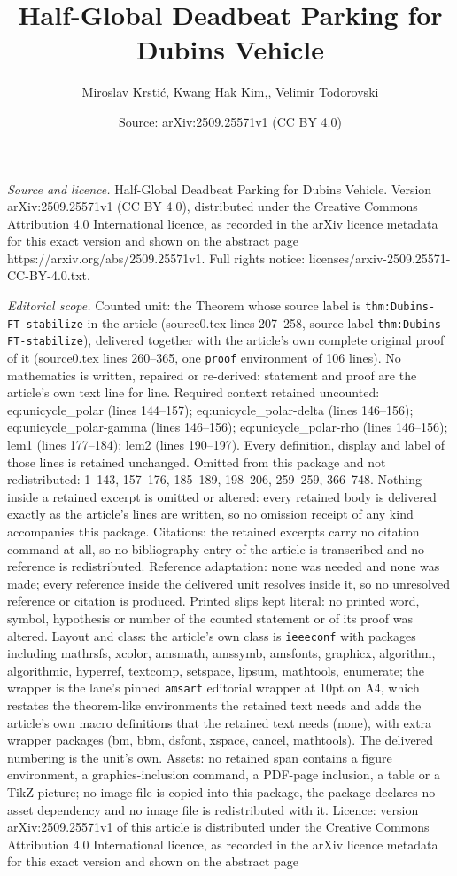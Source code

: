 \documentclass[10pt,a4paper]{amsart}
\title[Half-Global Deadbeat Parking for Dubins Vehicle]{Half-Global Deadbeat Parking for Dubins Vehicle}
\author{Miroslav Krsti\'c, Kwang Hak Kim,, Velimir Todorovski}
\date{Source: arXiv:2509.25571v1 (CC BY 4.0)}
\begin{document}
\maketitle

\noindent\emph{Source and licence.} Half-Global Deadbeat Parking for Dubins Vehicle. Version arXiv:2509.25571v1 (CC BY 4.0), distributed under the Creative Commons Attribution 4.0 International licence, as recorded in the arXiv licence metadata for this exact version and shown on the abstract page https://arxiv.org/abs/2509.25571v1. Full rights notice: licenses/arxiv-2509.25571-CC-BY-4.0.txt.\par\smallskip

\noindent\textit{Editorial scope.} Counted unit: the Theorem whose source label is \texttt{thm:Dubins-FT-stabilize} in the article (source0.tex lines 207--258, source label \texttt{thm:Dubins-FT-stabilize}), delivered together with the article's own complete original proof of it (source0.tex lines 260--365, one \texttt{proof} environment of 106 lines). No mathematics is written, repaired or re-derived: statement and proof are the article's own text line for line. Required context retained uncounted: eq:unicycle\_polar (lines 144--157); eq:unicycle\_polar-delta (lines 146--156); eq:unicycle\_polar-gamma (lines 146--156); eq:unicycle\_polar-rho (lines 146--156); lem1 (lines 177--184); lem2 (lines 190--197). Every definition, display and label of those lines is retained unchanged. Omitted from this package and not redistributed: 1--143, 157--176, 185--189, 198--206, 259--259, 366--748. Nothing inside a retained excerpt is omitted or altered: every retained body is delivered exactly as the article's lines are written, so no omission receipt of any kind accompanies this package. Citations: the retained excerpts carry no citation command at all, so no bibliography entry of the article is transcribed and no reference is redistributed. Reference adaptation: none was needed and none was made; every reference inside the delivered unit resolves inside it, so no unresolved reference or citation is produced. Printed slips kept literal: no printed word, symbol, hypothesis or number of the counted statement or of its proof was altered. Layout and class: the article's own class is \texttt{ieeeconf} with packages including mathrsfs, xcolor, amsmath, amssymb, amsfonts, graphicx, algorithm, algorithmic, hyperref, textcomp, setspace, lipsum, mathtools, enumerate; the wrapper is the lane's pinned \texttt{amsart} editorial wrapper at 10pt on A4, which restates the theorem-like environments the retained text needs and adds the article's own macro definitions that the retained text needs (none), with extra wrapper packages (bm, bbm, dsfont, xspace, cancel, mathtools). The delivered numbering is the unit's own. Assets: no retained span contains a figure environment, a graphics-inclusion command, a PDF-page inclusion, a table or a TikZ picture; no image file is copied into this package, the package declares no asset dependency and no image file is redistributed with it. Licence: version arXiv:2509.25571v1 of this article is distributed under the Creative Commons Attribution 4.0 International licence, as recorded in the arXiv licence metadata for this exact version and shown on the abstract page 
\end{document}
